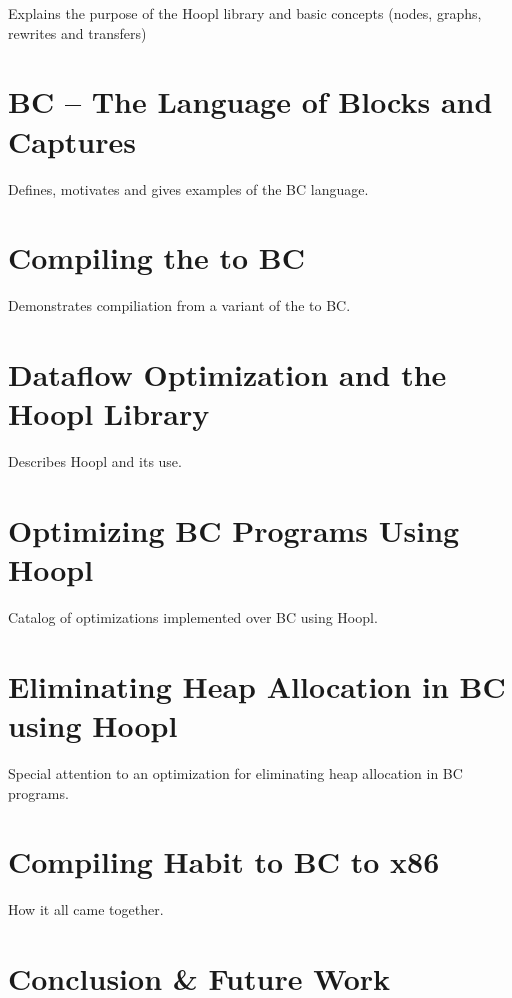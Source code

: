 \documentclass[11pt]{article}
\begin{document}
Explains the purpose of the Hoopl library and basic concepts (nodes, graphs, rewrites and transfers)

\section{BC -- The Language of Blocks and Captures}

Defines, motivates and gives examples of the BC language.

\section{Compiling the \lamA to BC}

Demonstrates compiliation from a variant of the \lamA to BC. 

\section{Dataflow Optimization and the Hoopl Library}

Describes Hoopl and its use.

\section{Optimizing BC Programs Using Hoopl}

Catalog of optimizations implemented over BC using Hoopl.

\section{Eliminating Heap Allocation in BC using Hoopl}

Special attention to an optimization for eliminating heap allocation
in BC programs.

\section{Compiling Habit to BC to x86}

How it all came together.

\section{Conclusion \& Future Work}
\end{document}
